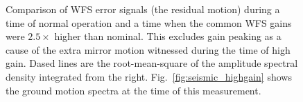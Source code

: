 \begin{figure}
\begin{centering}
\caption[Comparison of WFS error signals (the residual motion) during
a time of normal operation and a time when the common WFS gains were
$2.5\times$ higher than nominal]{Comparison of WFS error signals (the
  residual motion) during a time of normal operation and a time when
  the common WFS gains were $2.5\times$ higher than nominal. This
  excludes gain peaking as a cause of the extra mirror motion
  witnessed during the time of high gain. Dased lines are the
  root-mean-square of the amplitude spectral density integrated from
  the right. Fig.~\ref{fig:seismic_highgain} shows the ground motion
  spectra at the time of this measurement.}
\label{fig:WFS_inputbeam}
\end{centering}
\end{figure}










